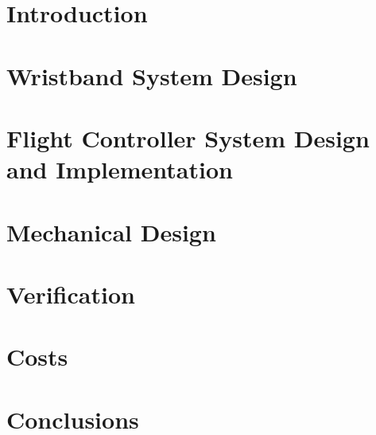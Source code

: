 \documentclass[12pt]{article}
\begin{document}
\hypersetup{pageanchor=true}


\clearpage
\section{Introduction}\label{sec:introduction}


\clearpage
\section{Wristband System Design}


\clearpage
\section{Flight Controller System Design and Implementation}\label{sec:flight-controller}


\clearpage
\section{Mechanical Design}


\clearpage
\section{Verification}


\clearpage
\section{Costs}


\clearpage
\section{Conclusions}


\clearpage
\printbibliography[heading=bibintoc, title={References}]

\begin{appendices}
    \clearpage
    
\end{appendices}
\end{document}
